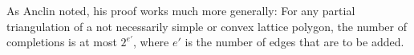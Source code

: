 As Anclin noted, his proof works much more generally:
For any partial triangulation of a not necessarily simple or convex
lattice polygon, the number of completions is at most $2^{e'}$,
where $e'$ is 
the number of edges that are to be added.





